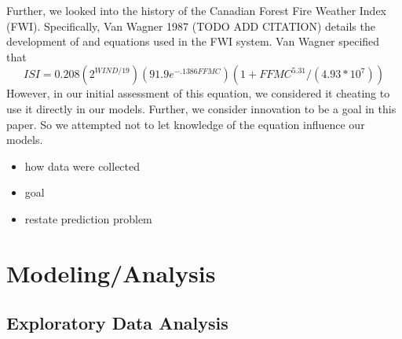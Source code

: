 \documentclass{article}
\begin{document}
Further, we looked into the history of the Canadian Forest Fire Weather Index (FWI). Specifically, Van Wagner 1987 (TODO ADD CITATION) details the development of and equations used in the FWI system. Van Wagner specified that $$ISI =  0.208(2^{WIND/19})(91.9e^{-.1386FFMC})(1+FFMC^{5.31}/(4.93*10^7))$$
However, in our initial assessment of this equation, we considered it cheating to use it directly in our models. Further, we consider innovation to be a goal in this paper. So we attempted not to let knowledge of the equation influence our models.

\begin{itemize}
\item how data were collected
\item goal
\item restate prediction problem

\end{itemize}

\section{Modeling/Analysis}\label{Analysis}

\subsection{Exploratory Data Analysis}
\end{document}
